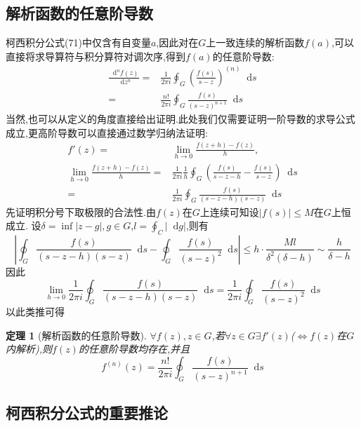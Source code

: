 \documentclass[UTF8]{ctexart}
\newcommand{\dif}{\mathop{}\!\mathrm{d}}
\newtheorem{theorem}{定理}
\begin{document}
\subsection{解析函数的任意阶导数}
柯西积分公式(71)中仅含有自变量$a$,因此对在$G$上一致连续的解析函数$f(a)$,可以直接将求导算符与积分算符对调次序,得到$f(a)$的任意阶导数:
\begin{align}
  \label{9}
  \frac{\dif^{n} f(z)}{\dif z^{n}}=&\frac{1}{2\pi i}\oint_{G}^{}(\frac{f(s)}{s-z})^{(n)}\dif s \\
  =&\frac{n!}{2\pi i}\oint_{G}^{}\frac{f(s)}{(s-z)^{n+1}}\dif s
\end{align}
当然,也可以从定义的角度直接给出证明.此处我们仅需要证明一阶导数的求导公式成立,更高阶导数可以直接通过数学归纳法证明:
\begin{equation}
  \begin{aligned}
    f'(z)=&\lim_{h \to 0} \frac{f(z+h)-f(z)}{h}, \\
    \lim_{h \to 0} \frac{f(z+h)-f(z)}{h}=&\frac{1}{2\pi i} \frac{1}{h}\oint_{G}^{}\left(\frac{f(s)}{s-z-h}-\frac{f(s)}{s-z}\right)\dif s \\
    =&\frac{1}{2\pi i}\oint_{G}^{}\frac{f(s)}{(s-z-h)(s-z)}\dif s
  \end{aligned}
\end{equation}
先证明积分号下取极限的合法性.由$f(z)$在$G$上连续可知设$\left| f(s) \right|\leqslant M$在$G$上恒成立.
设$\delta =\inf \left| z-g \right|,g\in G$,$l=\oint_{C}^{}\left| \dif g \right|$,则有
\begin{equation}
  \left| \oint_{G}^{}\frac{f(s)}{(s-z-h)(s-z)}\dif s-\oint_{G}^{}\frac{f(s)}{(s-z)^{2}}\dif s \right|\leqslant h\cdot\frac{Ml}{\delta^{2}(\delta-h)}\sim \frac{h}{\delta-h}
\end{equation}
因此
\begin{equation}
  \lim_{h \to 0} \frac{1}{2\pi i}\oint_{G}^{}\frac{f(s)}{(s-z-h)(s-z)}\dif s=\frac{1}{2\pi i}\oint_{G}^{}\frac{f(s)}{(s-z)^{2}}\dif s
\end{equation}
以此类推可得
\begin{theorem}[解析函数的任意阶导数]
  $\forall f(z),z \in G$,若$\forall z \in G\exists f'(z)$($\Leftrightarrow f(z)$在$G$内解析),则$f(z)$的任意阶导数均存在,并且
  \begin{equation}
    f^{(n)}(z)=\frac{n!}{2\pi i}\oint_{G}^{}\frac{f(s)}{(s-z)^{n+1}}\dif s
  \end{equation}
\end{theorem}

\subsection{柯西积分公式的重要推论}
\end{document}
